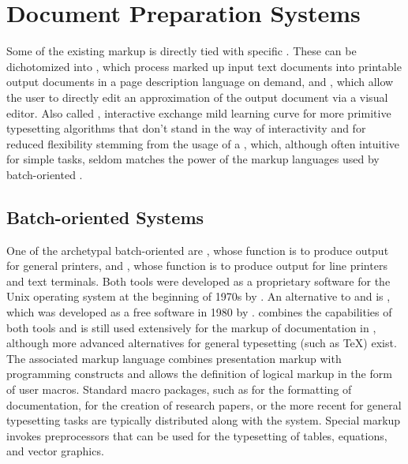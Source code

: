\documentclass[
  a5paper,10pt,           %
  dvipsnames              %
]{book}
\begin{document}
\section{Document Preparation Systems}
Some of the existing markup is directly tied with specific .
These  can be dichotomized into %
, which process marked up input
text documents into printable output documents in a page description language on
demand, and , which
allow the user to directly edit an approximation of the output document via a
visual editor. Also called , interactive  exchange
mild learning curve for more primitive typesetting algorithms that don't stand
in the way of interactivity and for reduced flexibility stemming from the usage
of a , which, although often intuitive for simple tasks, seldom
matches the power of the markup languages used by batch-oriented .

\subsection{Batch-oriented Systems}
One of the archetypal batch-oriented  are %
, whose function is to produce output for general
printers, and %
, whose function is to
produce output for line printers and text terminals. Both tools were developed
as a proprietary software for the Unix operating system at the beginning of
1970s by . An alternative to  and 
is , which
was developed as a free software in 1980 by . 
combines the capabilities of both tools and is still used extensively for the
markup of documentation in \Unices, although more advanced alternatives for
general typesetting (such as \TeX) exist. The associated markup language
combines presentation markup with programming constructs and allows the
definition of logical markup in the form of user macros. Standard macro
packages, such as  for the
 formatting of documentation,
  for the creation
of research papers, or the more recent 
 for general typesetting tasks
are typically distributed along with the system. Special markup invokes
preprocessors that can be used for the typesetting of tables, equations, and
vector graphics.
\end{document}
